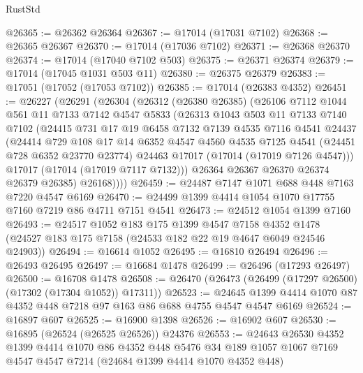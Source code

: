 \begin{lexlean}{RustStd}
\begin{coremodule}
@26365 := @26362 @26364
@26367 := @17014 (@17031 @7102)
@26368 := @26365 @26367
@26370 := @17014 (@17036 @7102)
@26371 := @26368 @26370
@26374 := @17014 (@17040 @7102 @503)
@26375 := @26371 @26374
@26379 := @17014 (@17045 @1031 @503 @11)
@26380 := @26375 @26379
@26383 := @17051 (@17052 (@17053 @7102))
@26385 := @17014 (@26383 @4352)
@26451 := @26227
    (@26291
      (@26304
        (@26312
          (@26380 @26385)
          (@26106
            @7112
            @1044
            @561
            @11
            @7133
            @7142
            @4547
            @5833
            (@26313
              @1043
              @503
              @11
              @7133
              @7140
              @7102
              (@24415
                @731
                @17
                @19
                @6458
                @7132
                @7139
                @4535
                @7116
                @4541
                @24437
                (@24414
                  @729
                  @108
                  @17
                  @14
                  @6352
                  @4547
                  @4560
                  @4535
                  @7125
                  @4541
                  (@24451 @728 @6352 @23770 @23774)
                  @24463
                  @17017
                  (@17014 (@17019 @7126 @4547)))
                @17017
                (@17014 (@17019 @7117 @7132)))
              @26364
              @26367
              @26370
              @26374
              @26379
              @26385)
            @26168))))
@26459 := @24487 @7147 @1071 @688 @448 @7163 @7220 @4547 @6169
@26470 := @24499 @1399 @4414 @1054 @1070 @17755 @7160 @7219 @86 @4711 @7151 @4541
@26473 := @24512 @1054 @1399 @7160
@26493 := @24517
    @1052
    @183
    @175
    @1399
    @4547
    @7158
    @4352
    @1478
    (@24527 @183 @175 @7158 (@24533 @182 @22 @19 @4647 @6049 @24546 @24903))
@26494 := @16614 @1052
@26495 := @16810 @26494
@26496 := @26493 @26495
@26497 := @16684 @1478
@26499 := @26496 (@17293 @26497)
@26500 := @16708 @1478
@26508 := @26470 (@26473 (@26499 (@17297 @26500) (@17302 (@17304 @1052)) @17311))
@26523 := @24645 @1399 @4414 @1070 @87 @4352 @448 @7218 @97 @163 @86 @688 @4755 @4547 @4547 @6169
@26524 := @16897 @607
@26525 := @16900 @1398
@26526 := @16902 @607
@26530 := @16895 (@26524 (@26525 @26526)) @24376
@26553 := @24643
    @26530
    @4352
    @1399
    @4414
    @1070
    @86
    @4352
    @448
    @5476
    @34
    @189
    @1057
    @1067
    @7169
    @4547
    @4547
    @7214
    (@24684 @1399 @4414 @1070 @4352 @448)

\end{coremodule}
\end{lexlean}
